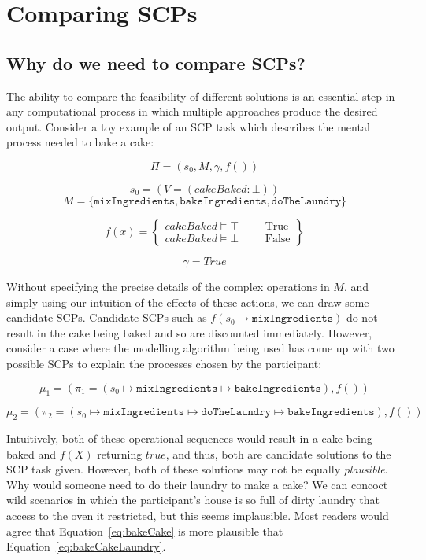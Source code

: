 \chapter{Comparing SCPs} \label{chp:comparing}
\section{Why do we need to compare SCPs?} \label{sec:whyCompare}
The ability to compare the feasibility of different solutions is an essential step in any computational process in which multiple approaches produce the desired output. Consider a toy example of an SCP task which describes the mental process needed to bake a cake:

\[
\Pi = (s_0, M, \gamma, f())
\]

\[
s_0 = (V=(cakeBaked: \bot) )
\]
\[
M=\{\texttt{mixIngredients}, \texttt{bakeIngredients}, \texttt{doTheLaundry}\}
\]

\[
f(x)= \left\{ \begin{split} cakeBaked \models \top & & & \textrm{True}\\ cakeBaked \models \bot & & & \textrm{False} \end{split} \right\}
\]

\[
\gamma  = True
\]

Without specifying the precise details of the complex operations in $M$, and simply using our intuition of the effects of these actions, we can draw some candidate SCPs. Candidate SCPs such as $f(s_0 \longmapsto \texttt{mixIngredients})$ do not result in the cake being baked and so are discounted immediately. However, consider a case where the modelling algorithm being used has come up with two possible SCPs to explain the processes chosen by the participant:

\begin{equation} \label{eq:bakeCake}
\mu_1 = (\pi_1=(s_0\longmapsto \texttt{mixIngredients} \longmapsto \texttt{bakeIngredients}),f())
\end{equation}

\begin{equation} \label{eq:bakeCakeLaundry}
\mu_2 = (\pi_2 = (s_0 \longmapsto \texttt{mixIngredients} \longmapsto  \texttt{doTheLaundry} \longmapsto \texttt{bakeIngredients}),f())
\end{equation}

Intuitively, both of these operational sequences would result in a cake being baked and $f(X)$ returning $true$, and thus, both are candidate solutions to the SCP task given. However, both of these solutions may not be equally \textit{plausible}. Why would someone need to do their laundry to make a cake? We can concoct wild scenarios in which the participant's house is so full of dirty laundry that access to the oven it restricted, but this seems implausible. Most readers would agree that Equation~\ref{eq:bakeCake} is more plausible that Equation~\ref{eq:bakeCakeLaundry}.

